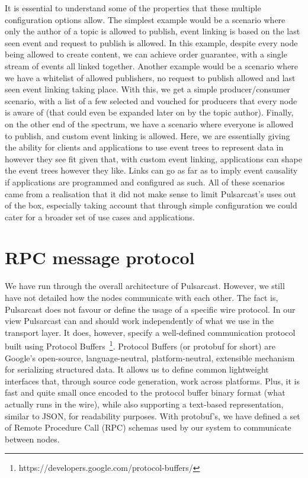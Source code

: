 It is essential to understand some of the properties that these multiple
configuration options allow. The simplest example would be a scenario where
only the author of a topic is allowed to publish, event linking is based on the
last seen event and request to publish is allowed. In this example, despite
every node being allowed to create content, we can achieve order guarantee,
with a single stream of events all linked together. Another example would be a
scenario where we have a whitelist of allowed publishers, no request to publish
allowed and last seen event linking taking place. With this, we get a simple
producer/consumer scenario, with a list of a few selected and vouched for
producers that every node is aware of (that could even be expanded later on by
the topic author). Finally, on the other end of the spectrum, we have a
scenario where everyone is allowed to publish, and custom event linking is
allowed. Here, we are essentially giving the ability for clients and
applications to use event trees to represent data in however they see fit given
that, with custom event linking, applications can shape the event trees however
they like. Links can go as far as to imply event causality if applications are
programmed and configured as such. All of these scenarios came from a
realisation that it did not make sense to limit Pulsarcast's uses out of the
box, especially taking account that through simple configuration we could cater
for a broader set of use cases and applications.

\section{RPC message protocol}\label{rpc-message}

We have run through the overall architecture of Pulsarcast. However, we still
have not detailed how the nodes communicate with each other. The fact is,
Pulsarcast does not favour or define the usage of a specific wire protocol. In
our view Pulsarcast can and should work independently of what we use in the
transport layer. It does, however, specify a well-defined communication
protocol built using Protocol
Buffers~\footnote{https://developers.google.com/protocol-buffers/}. Protocol
Buffers (or protobuf for short) are Google's open-source, language-neutral,
platform-neutral, extensible mechanism for serializing structured data. It
allows us to define common lightweight interfaces that, through source code
generation, work across platforms. Plus, it is fast and quite small once
encoded to the protocol buffer binary format (what actually runs in the wire),
while also supporting a text-based representation, similar to JSON, for
readability purposes. With protobuf's, we have defined a set of Remote
Procedure Call (RPC) schemas used by our system to communicate between nodes.

